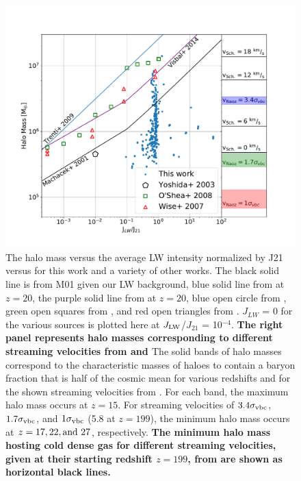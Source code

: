 \documentclass[fleqn,usenatbib]{mnras}
\begin{document}
\begin{figure}
	\includegraphics[width=\columnwidth]{images/compare_JLW_mass.pdf}
    \caption{The halo mass versus the average LW intensity normalized by J21 versus for this work and a variety of other works. The black solid line is from M01 given our LW background, blue solid line from \citet{Trenti09_SFR} at $z=20$, the purple solid line from \citet{Visbal14} at $z=20$, blue open circle from \citet{Yoshida03}, green open squares from \citet{OShea08}, and red open triangles from \citet{Wise07_UVB}. $J_{LW}$ = 0 for the various sources is plotted here at $J_{\rm LW}$/$J_{21}$ = 10$^{-4}$. \textbf{The right panel represents halo masses corresponding to different streaming velocities from \citet{Naoz13} and \citet{Schauer19}} The solid bands of halo masses correspond to the characteristic masses of haloes to contain a baryon fraction that is half of the cosmic mean for various redshifts and for the shown streaming velocities from \citet{Naoz13}. For each band, the maximum halo mass occurs at $z = 15$. For streaming velocities of $3.4 \sigma_{\rm vbc}$, $1.7 \sigma_{\rm vbc}$, and $1 \sigma_{\rm vbc}$ (5.8 \kms{} at $z=199$), the minimum halo mass occurs at $z = 17, 22, \rm{and} \ 27$, respectively. \textbf{The minimum halo mass hosting cold dense gas for different streaming velocities, given at their starting redshift $z=199$, from \citet{Schauer19} are shown as horizontal black lines.}}
    \label{fig:compare_JLW_mass}
\end{figure}
\end{document}
